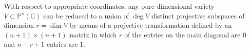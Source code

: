 With respect to appropriate coordinates, any pure-dimensional variety $V \subset \mathbb{P}^n(\mathbb{C})$ can be reduced to a union of $\deg V$ distinct projective subspaces of dimension $r = \dim V$ by means of a projective transformation defined by an $(n+1) \times (n+1)$ matrix in which $r$ of the entries on the main diagonal are $0$ and $n-r+1$ entries are $1$.
